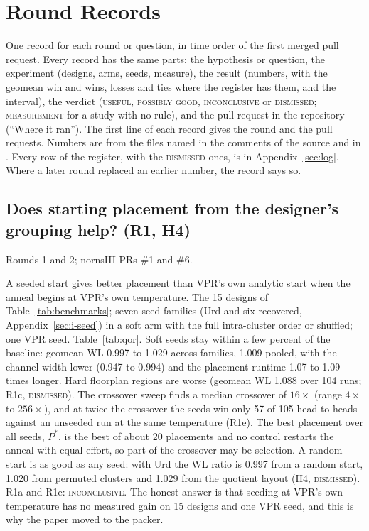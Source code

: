 \section{Round Records}
\label{sec:records}

One record for each round or question, in time order of the first merged pull request. Every record has the same parts: the hypothesis or question, the experiment (designs, arms, seeds, measure), the result (numbers, with the geomean win and wins, losses and ties where the register has them, and the interval), the verdict (\textsc{useful}, \textsc{possibly good}, \textsc{inconclusive} or \textsc{dismissed}; \textsc{measurement} for a study with no rule), and the pull request in the repository  (``Where it ran''). The first line of each record gives the round and the pull requests. Numbers are from the files named in the comments of the source and in . Every row of the register, with the \textsc{dismissed} ones, is in Appendix~\ref{sec:log}. Where a later round replaced an earlier number, the record says so.

\subsection{Does starting placement from the designer's grouping help? (R1, H4)}
\label{sec:e-seed}

 Rounds 1 and 2; nornsIII PRs \#1 and \#6.

 A seeded start gives better placement than VPR's own analytic start when the anneal begins at VPR's own temperature.
 The 15 designs of Table~\ref{tab:benchmarks}; seven seed families (Urd and six recovered, Appendix~\ref{sec:i-seed}) in a soft arm with the full intra-cluster order or shuffled; one VPR seed.
 Table~\ref{tab:qor}. Soft seeds stay within a few percent of the baseline: geomean WL 0.997 to 1.029 across families, 1.009 pooled, with the channel width lower (0.947 to 0.994) and the placement runtime 1.07 to 1.09 times longer. %
Hard floorplan regions are worse (geomean WL 1.088 over 104 runs; R1c, \textsc{dismissed}). The crossover sweep finds a median crossover of $16\times$ (range $4\times$ to $256\times$), and at twice the crossover the seeds win only 57 of 105 head-to-heads against an unseeded run at the same temperature (R1e). The best placement over all seeds, $P^*$, is the best of about 20 placements and no control restarts the anneal with equal effort, so part of the crossover may be selection. A random start is as good as any seed: with Urd the WL ratio is 0.997 from a random start, 1.020 from permuted clusters and 1.029 from the quotient layout (H4, \textsc{dismissed}).
 R1a and R1e: \textsc{inconclusive}. The honest answer is that seeding at VPR's own temperature has no measured gain on 15 designs and one VPR seed, and this is why the paper moved to the packer.

